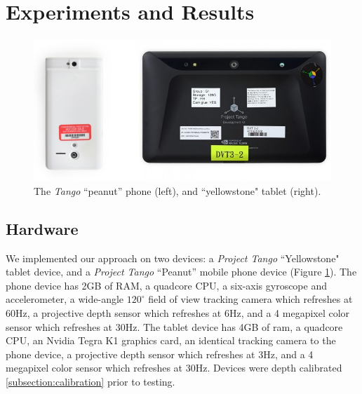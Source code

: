 \documentclass[10pt,twocolumn,letterpaper]{article}
\begin{document}
\section{Experiments and Results}
\begin{figure}
  \centering
    \includegraphics[width=1.0\columnwidth]{img/devices}
      \caption{The \textit{Tango}\cite{Tango} ``peanut'' phone (left), and
      ``yellowstone" tablet (right).}
  \label{fig:devices}
\end{figure}

\subsection{Hardware}
We implemented our approach on two devices: a \textit{Project Tango}
``Yellowstone" tablet device, and a \textit{Project Tango} ``Peanut'' mobile 
phone
device (Figure \ref{fig:devices}). The phone device has 2GB of RAM, a quadcore
CPU, a six-axis gyroscope and accelerometer, a wide-angle $120^\circ$ field of
view tracking camera which refreshes at 60Hz, a projective depth sensor which
refreshes at 6Hz, and a 4 megapixel color sensor which refreshes at 30Hz. The
tablet device has 4GB of ram, a quadcore CPU, an Nvidia Tegra K1 graphics card,
an identical tracking camera to the phone device, a projective depth sensor
which refreshes at 3Hz, and a 4 megapixel color sensor which refreshes at 30Hz.
Devices were depth calibrated \ref{subsection:calibration} prior to testing. 
\end{document}
